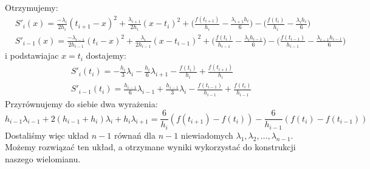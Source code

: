 \documentclass[a4paper]{article}
\begin{document}
\newpage
    Otrzymujemy:
    \[
        \begin{aligned}
            & S'_i(x) = \frac{-\lambda_i}{2h_i}(t_{i+1} - x)^2 + \frac{\lambda_{i+1}}{2h_i}(x - t_i)^2
            + \bigg(\frac{f(t_{i+1})}{h_i} - \frac{\lambda_{i+1}h_i}{6}\bigg)
            - \bigg(\frac{f(t_{i})}{h_i} - \frac{\lambda_ih_i}{6}\bigg) \\
            & S'_{i-1}(x) = \frac{-\lambda_{i-1}}{2h_{i-1}}(t_{i} - x)^2 + \frac{\lambda_{i}}{2h_{i-1}}(x - t_{i-1})^2
            + \bigg(\frac{f(t_{i})}{h_{i-1}} - \frac{\lambda_{i}h_{i-1}}{6}\bigg)
            - \bigg(\frac{f(t_{i-1})}{h_{i-1}} - \frac{\lambda_{i-1}h_{i-1}}{6}\bigg) 
        \end{aligned}
    \]
    i podstawiajac $x = t_i$ dostajemy:
    \[
        \begin{aligned}
            & S'_i(t_i) = -\frac{h_i}{3}\lambda_i - \frac{h_i}{6}\lambda_{i+1} - \frac{f(t_i)}{h_i} + \frac{f(t_{i+1})}{h_i} \\
            & S'_{i-1}(t_i) = \frac{h_{i-1}}{6}\lambda_{i-1} + \frac{h_{i-1}}{3}\lambda_{i} - \frac{f(t_{i-1})}{h_{i-1}} + \frac{f(t_{i})}{h_{i-1}}
        \end{aligned}
    \]
    Przyrównujemy do siebie dwa wyrażenia:
    \[
        h_{i-1}\lambda_{i-1} + 2(h_{i-1} + h_i)\lambda_i + h_i\lambda_{i+1} = \frac{6}{h_i}(f(t_{i+1}) - f(t_i)) - \frac{6}{h_{i-1}}(f(t_i) - f(t_{i-1}))
    \]
    Dostaliśmy więc układ $n-1$ równań dla $n-1$ niewiadomych $\lambda_1, \lambda_2, \dotsc, \lambda_{n-1}$. Możemy rozwiązać ten układ, \newline a otrzymane
    wyniki wykorzystać do konstrukcji naszego wielomianu.
\end{document}
